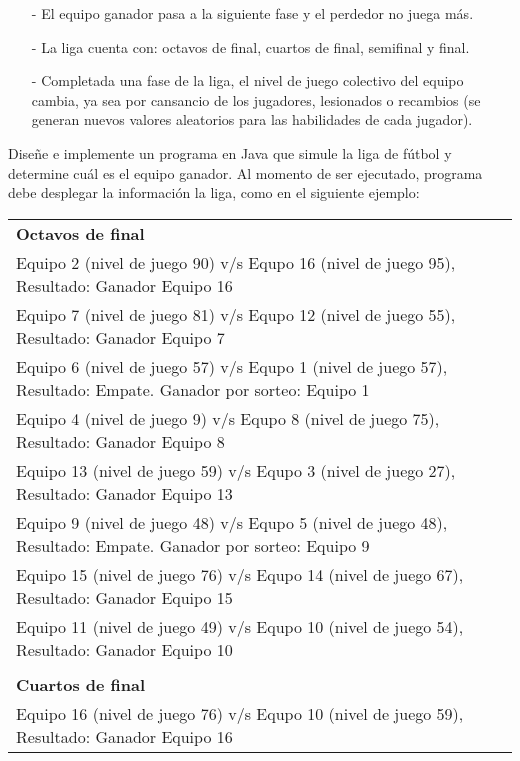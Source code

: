 \documentclass[10pt]{article}
\begin{document}
\begin{enumerate}
{\begin{itemize}
\begin{itemize}
        \item[-] El equipo ganador pasa a la siguiente fase y el perdedor no juega m\'as.
        \item[-] La liga cuenta con: octavos de final, cuartos de final, semifinal y final.
        \item[-] Completada una fase de la liga, el nivel de juego colectivo del equipo cambia, ya sea por cansancio de los jugadores, lesionados o recambios (se generan nuevos valores aleatorios para las habilidades de cada jugador).
    \end{itemize} 
\end{itemize} 
    Dise\~ne e implemente un programa en Java que simule la liga de f\'utbol y determine cu\'al es el equipo ganador. Al momento de ser ejecutado, programa debe desplegar la informaci\'on la liga, como en el siguiente ejemplo:
    \begin{table}[H]
        \begin{center}
            {\scriptsize
            \begin{tabular}{l}
                \textbf{Octavos de final} \\
                Equipo 2 (nivel de juego 90) v/s Equpo 16 (nivel de juego 95), Resultado: Ganador Equipo 16 \\
                Equipo 7 (nivel de juego 81) v/s Equpo 12 (nivel de juego 55), Resultado: Ganador Equipo 7 \\
                Equipo 6 (nivel de juego 57) v/s Equpo 1 (nivel de juego 57), Resultado: Empate. Ganador por sorteo: Equipo 1 \\
                Equipo 4 (nivel de juego 9) v/s Equpo 8 (nivel de juego 75), Resultado: Ganador Equipo 8 \\
                Equipo 13 (nivel de juego 59) v/s Equpo 3 (nivel de juego 27), Resultado: Ganador Equipo 13 \\
                Equipo 9 (nivel de juego 48) v/s Equpo 5 (nivel de juego 48), Resultado: Empate. Ganador por sorteo: Equipo 9 \\
                Equipo 15 (nivel de juego 76) v/s Equpo 14 (nivel de juego 67), Resultado: Ganador Equipo 15 \\ 
                Equipo 11 (nivel de juego 49) v/s Equpo 10 (nivel de juego 54), Resultado: Ganador Equipo 10 \\  \\
                \textbf{Cuartos de final} \\
                Equipo 16 (nivel de juego 76) v/s Equpo 10  (nivel de juego 59), Resultado: Ganador Equipo 16 \\

\end{tabular}}
\end{center}
\end{table}}
\end{enumerate}
\end{document}
